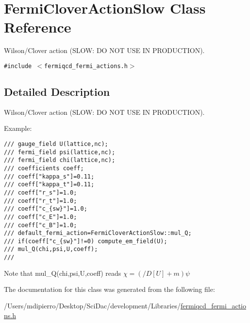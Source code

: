 \hypertarget{class_fermi_clover_action_slow}{
\section{FermiCloverActionSlow Class Reference}
\label{class_fermi_clover_action_slow}
}
Wilson/Clover action (SLOW: DO NOT USE IN PRODUCTION).  


{\tt \#include $<$fermiqcd\_\-fermi\_\-actions.h$>$}



\subsection{Detailed Description}
Wilson/Clover action (SLOW: DO NOT USE IN PRODUCTION). 

Example: 

\footnotesize\begin{verbatim}
/// gauge_field U(lattice,nc);
/// fermi_field psi(lattice,nc);
/// fermi_field chi(lattice,nc);
/// coefficients coeff;
/// coeff["kappa_s"]=0.11;
/// coeff["kappa_t"]=0.11;
/// coeff["r_s"]=1.0;
/// coeff["r_t"]=1.0;
/// coeff["c_{sw}"]=1.0;
/// coeff["c_E"]=1.0;
/// coeff["c_B"]=1.0;
/// default_fermi_action=FermiCloverActionSlow::mul_Q;
/// if(coeff["c_{sw}"]!=0) compute_em_field(U);
/// mul_Q(chi,psi,U,coeff);
/// \end{verbatim}
\normalsize
 Note that mul\_\-Q(chi,psi,U,coeff) reads $ \chi=(/\!\!\!D[U]+m)\psi $ 

The documentation for this class was generated from the following file:\begin{CompactItemize}
\item 
/Users/mdipierro/Desktop/SciDac/development/Libraries/\hyperlink{fermiqcd__fermi__actions_8h}{fermiqcd\_\-fermi\_\-actions.h}\end{CompactItemize}
